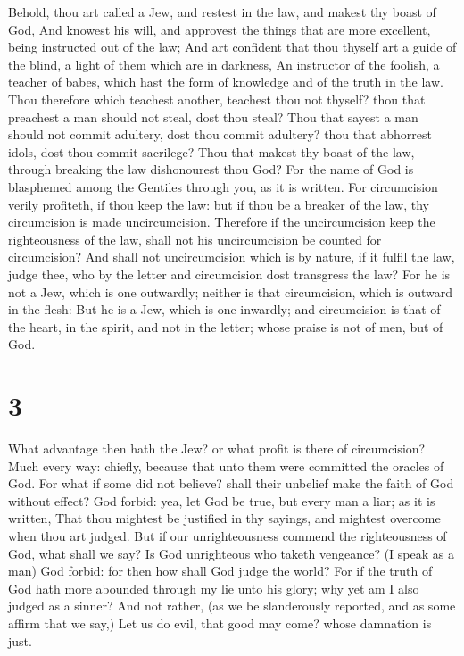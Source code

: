  Behold, thou art called a Jew, and restest in the law, and
makest thy boast of God,  And knowest his will, and
approvest the things that are more excellent, being instructed out of
the law;  And art confident that thou thyself art a guide
of the blind, a light of them which are in darkness,  An
instructor of the foolish, a teacher of babes, which hast the form of
knowledge and of the truth in the law.  Thou therefore
which teachest another, teachest thou not thyself? thou that preachest a
man should not steal, dost thou steal?  Thou that sayest a
man should not commit adultery, dost thou commit adultery? thou that
abhorrest idols, dost thou commit sacrilege?  Thou that
makest thy boast of the law, through breaking the law dishonourest thou
God?  For the name of God is blasphemed among the Gentiles
through you, as it is written.  For circumcision verily
profiteth, if thou keep the law: but if thou be a breaker of the law,
thy circumcision is made uncircumcision.  Therefore if the
uncircumcision keep the righteousness of the law, shall not his
uncircumcision be counted for circumcision?  And shall not
uncircumcision which is by nature, if it fulfil the law, judge thee, who
by the letter and circumcision dost transgress the law? 
For he is not a Jew, which is one outwardly; neither is that
circumcision, which is outward in the flesh:  But he is a
Jew, which is one inwardly; and circumcision is that of the heart, in
the spirit, and not in the letter; whose praise is not of men, but of
God.

\hypertarget{section-2}{%
\section{3}\label{section-2}}

 What advantage then hath the Jew? or what profit is there
of circumcision?  Much every way: chiefly, because that unto
them were committed the oracles of God.  For what if some
did not believe? shall their unbelief make the faith of God without
effect?  God forbid: yea, let God be true, but every man a
liar; as it is written, That thou mightest be justified in thy sayings,
and mightest overcome when thou art judged.  But if our
unrighteousness commend the righteousness of God, what shall we say? Is
God unrighteous who taketh vengeance? (I speak as a man) 
God forbid: for then how shall God judge the world?  For if
the truth of God hath more abounded through my lie unto his glory; why
yet am I also judged as a sinner?  And not rather, (as we be
slanderously reported, and as some affirm that we say,) Let us do evil,
that good may come? whose damnation is just.

